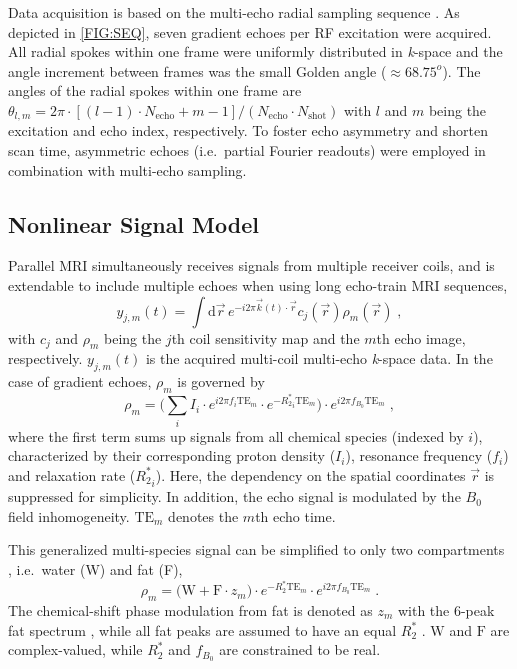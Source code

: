\documentclass[journal,twoside,web]{ieeecolor}
\begin{document}
Data acquisition is based on the multi-echo radial sampling sequence 
\cite{tan_2019_mobawf}. 
As depicted in \cref{FIG:SEQ}, seven gradient echoes per RF excitation 
were acquired. 
All radial spokes within one frame were uniformly distributed in \textit{k}-space 
and the angle increment between frames was the small Golden angle 
\cite{winkelmann_2007_golden} ($\approx 68.75^o$).
The angles of the radial spokes within one frame are 
$\theta_{l,m} = 2\pi \cdot [ (l-1) \cdot N_\text{echo} + m - 1 ] / (N_\text{echo} \cdot N_\text{shot})$ 
with $l$ and $m$ being the excitation and echo index, respectively. 
To foster echo asymmetry and shorten scan time, 
asymmetric echoes (i.e.~partial Fourier readouts) were employed in combination with 
multi-echo sampling.


\subsection{Nonlinear Signal Model}

Parallel MRI \cite{roemer_1990_pi,pruessmann_1999_sense,griswold_2002_grappa} 
simultaneously receives signals from multiple receiver coils, 
and is extendable to include multiple echoes when using long echo-train MRI sequences,
\begin{equation} \label{EQU:y_pimeco}
y_{j,m}(t) = \int \text{d} \vec{r} \, e^{-i 2\pi \vec{k} (t) \cdot \vec{r} } c_j(\vec{r}) \rho_m(\vec{r}) \;,
\end{equation}
with $c_j$ and $\rho_m$ being the $j$th coil sensitivity map and the $m$th echo image, respectively. 
$y_{j,m}(t)$ is the acquired multi-coil multi-echo \textit{k}-space data.
In the case of gradient echoes, $\rho_m$ is governed by
\begin{equation} \label{EQU:meco_mspec}
\rho_m = \bigg( \sum_i I_i \cdot e^{i2\pi f_i \text{TE}_m} \cdot e^{-{R_2^*}_i \text{TE}_m} \bigg) \cdot e^{i2\pi f_{B_0} \text{TE}_m} \; ,
\end{equation}
where the first term sums up signals from all chemical species (indexed by $i$), 
characterized by their corresponding proton density ($I_i$), 
resonance frequency ($f_i$) and relaxation rate (${R_2^*}_i$). 
Here, the dependency on the spatial coordinates $\vec{r}$ is suppressed for simplicity.
In addition, the echo signal is modulated by the $B_0$ field inhomogeneity. 
$\text{TE}_m$ denotes the $m$th echo time.

This generalized multi-species signal can be simplified to only two compartments \cite{yu_2007_t2sideal,yu_2008_mft2sideal,chebrolu_2010_indiwf}, 
i.e.~water (W) and fat (F), 
\begin{equation} \label{EQU:meco_wfr2s}
\rho_m = \bigg( \text{W} + \text{F} \cdot z_m \bigg) \cdot e^{- R_2^* \text{TE}_m} \cdot e^{i2\pi f_{B_0} \text{TE}_m} \; .
\end{equation}
The chemical-shift phase modulation from fat is denoted as 
$z_m$ with the 6-peak fat spectrum \cite{yu_2008_mft2sideal}, 
while all fat peaks are assumed to have an equal $R_2^*$ \cite{reeder_2012_perfr2s}.
$\text{W}$ and $\text{F}$ are complex-valued, 
while $R_2^*$ and $f_{B_0}$ are constrained to be real. 
\end{document}
